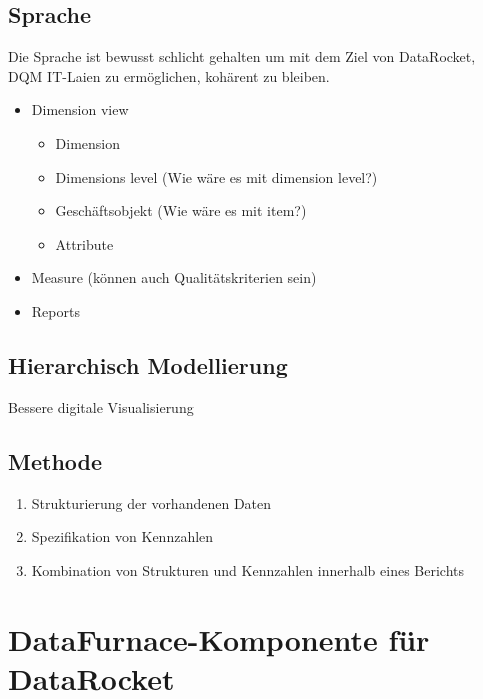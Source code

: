 \documentclass[
  language=german, %
  type=bachelor%
]{isthesis}
\begin{document}
\begin{content}
  \section{Sprache}
  \begin{figure}[caption={Metamodell der DataFurnace-Sprache}, label={fig:img01}]
    \resizebox{\columnwidth}{!}{}
  \end{figure}
  Die Sprache ist bewusst schlicht gehalten um mit dem Ziel von DataRocket, \acrshort{DQM}
  IT-Laien zu ermöglichen, kohärent zu bleiben.
  \begin{itemize}
    \item Dimension view
      \begin{itemize}
        \item Dimension
        \item Dimensions level (Wie wäre es mit dimension level?)
        \item Geschäftsobjekt (Wie wäre es mit item?)
        \item Attribute
      \end{itemize}
    \item Measure (können auch Qualitätskriterien sein)
    \item Reports 
  \end{itemize}

  \section{Hierarchisch Modellierung}
  Bessere digitale Visualisierung~\citep[][S. 6 f.]{fleischer2013konstruktion}

  \section{Methode}
  \begin{enumerate}
    \item Strukturierung der vorhandenen Daten
    \item Spezifikation von Kennzahlen
    \item Kombination von Strukturen und Kennzahlen innerhalb eines Berichts
  \end{enumerate}


  \chapter{DataFurnace-Komponente für DataRocket}


\end{content}
\end{document}
